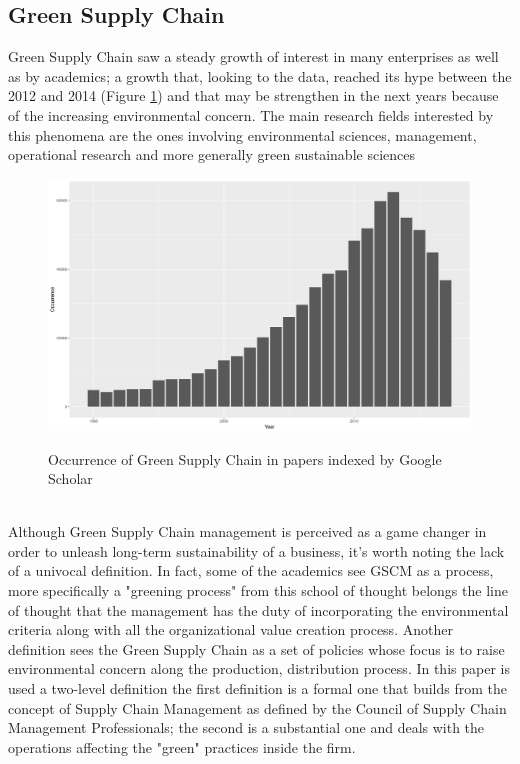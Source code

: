 \begin{doublespace}
\pagebreak

\section{Green Supply Chain}
Green Supply Chain saw a steady growth of interest in many enterprises\cite{Diabat2011} as well as by academics; a growth that, looking to the data\cite{Strobel2018}, reached its hype between the 2012 and 2014 (Figure \ref{fig:occurrence}) and that may be strengthen in the next years because of the increasing environmental concern. The main research fields interested by this phenomena are the ones involving environmental sciences, management, operational research and more generally green sustainable sciences\cite{Shan2018}  
\begin{figure}[ht]
	\includegraphics[width=\textwidth]{Images/occurence.png}	
	\label{fig:occurrence}
	\caption{Occurrence of Green Supply Chain in papers indexed by Google Scholar}	
\end{figure}
\\
Although Green Supply Chain management is perceived as a game changer in order to unleash long-term sustainability of a business, it's worth noting the lack of a univocal definition. In fact, some of the academics see GSCM as a process\cite{Gilbert2001}, more specifically a "greening process" from this school of thought belongs the line of thought that the management has the duty of incorporating the environmental criteria along with all the organizational value creation process. Another definition sees the Green Supply Chain as a set of policies whose focus is to raise environmental concern along the production, distribution process\cite{Zsidisin2001}. In this paper is used a two-level definition the first definition is a formal one that builds from the concept of Supply Chain Management as defined by the Council of Supply Chain Management Professionals; the second is a substantial one and deals with the operations affecting the "green" practices inside the firm.

\end{doublespace}
